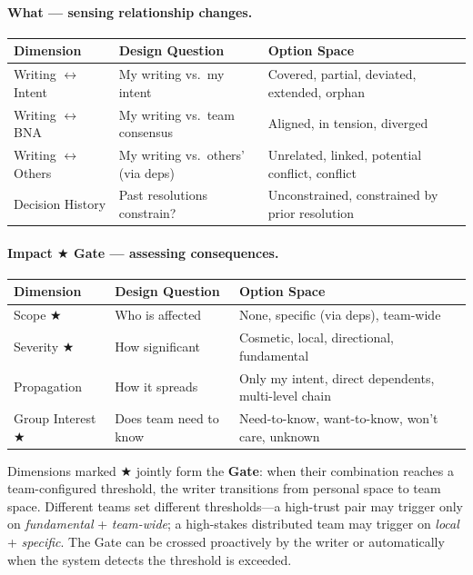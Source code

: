 \paragraph{What --- sensing relationship changes.}

\begin{table}[h]
\small
\begin{tabular}{@{}lp{2cm}p{4.5cm}@{}}
\toprule
\textbf{Dimension} & \textbf{Design Question} & \textbf{Option Space} \\
\midrule
Writing $\leftrightarrow$ Intent & My writing vs.\ my intent & Covered, partial, deviated, extended, orphan \\
Writing $\leftrightarrow$ BNA & My writing vs.\ team consensus & Aligned, in tension, diverged \\
Writing $\leftrightarrow$ Others & My writing vs.\ others' (via deps) & Unrelated, linked, potential conflict, conflict \\
Decision History & Past resolutions constrain? & Unconstrained, constrained by prior resolution \\
\bottomrule
\end{tabular}
\end{table}

\paragraph{Impact $\bigstar$ Gate --- assessing consequences.}

\begin{table}[h]
\small
\begin{tabular}{@{}lp{2cm}p{4.5cm}@{}}
\toprule
\textbf{Dimension} & \textbf{Design Question} & \textbf{Option Space} \\
\midrule
Scope $\bigstar$ & Who is affected & None, specific (via deps), team-wide \\
Severity $\bigstar$ & How significant & Cosmetic, local, directional, fundamental \\
Propagation & How it spreads & Only my intent, direct dependents, multi-level chain \\
Group Interest $\bigstar$ & Does team need to know & Need-to-know, want-to-know, won't care, unknown \\
\bottomrule
\end{tabular}
\end{table}

\noindent Dimensions marked $\bigstar$ jointly form the \textbf{Gate}: when their combination reaches a team-configured threshold, the writer transitions from personal space to team space. Different teams set different thresholds---a high-trust pair may trigger only on \emph{fundamental} + \emph{team-wide}; a high-stakes distributed team may trigger on \emph{local} + \emph{specific}. The Gate can be crossed proactively by the writer or automatically when the system detects the threshold is exceeded.


